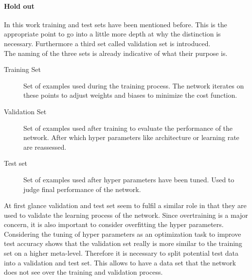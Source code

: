 				\paragraph{Hold out}%
					In this work training and test sets have been mentioned before. This is the appropriate point to go into a little more depth at why the distinction is necessary. Furthermore a third set called validation set is introduced.\\
					The naming of the three sets is already indicative of what their purpose is.
					\begin{description}
						\item[Training Set] Set of examples used during the training process. The network iterates on these points to adjust weights and biases to minimize the cost function.
						\item[Validation Set] Set of examples used after training to evaluate the performance of the network. After which hyper parameters like architecture or learning rate are reassessed.
						\item[Test set] Set of examples used after hyper parameters have been tuned. Used to judge final performance of the network.
					\end{description}
					At first glance validation and test set seem to fulfil a similar role in that they are used to validate the learning process of the network. Since overtraining is a major concern, it is also important to consider overfitting the hyper parameters. Considering the tuning of hyper parameters as an optimization task to improve test accuracy shows that the validation set really is more similar to the training set on a higher meta-level. Therefore it is necessary to split potential test data into a validation and test set. This allows to have a data set that the network does not see over the training and validation process.

